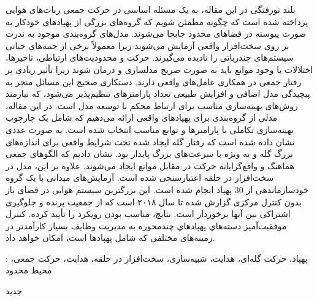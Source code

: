 


\pagestyle{empty}

\begin{وسط‌چین}
\end{وسط‌چین}


‌بلند
‌تورفتگی 
در این مقاله، به یک مسئله اساسی در حرکت جمعی ربات‌های هوایی پرداخته شده است که چگونه مطمئن شویم که گروه‌های بزرگی از پهپادهای خودکار به صورت پیوسته در فضاهای محدود جابجا می‌شوند. مدل‌های گروه‌بندی موجود به ندرت بر روی سخت‌افزار واقعی آزمایش می‌شوند زیرا معمولاً برخی از جنبه‌های حیاتی سیستم‌های چندرباتی را نادیده می‌گیرند. حرکت و محدودیت‌های ارتباطی، تاخیرها، اختلالات یا وجود موانع باید به صورت صریح مدلسازی و درمان شوند زیرا تأثیر زیادی بر رفتار جمعی در همکاری عامل‌های واقعی دارند. دستکاری صحیح این مسائل منجر به پیچیدگی مدل اضافی و افزایش طبیعی تعداد پارامترهای تنظیم‌پذیر می‌شود، که نیازمند روش‌های بهینه‌سازی مناسب برای ارتباط محکم با توسعه مدل است. در این مقاله، مدلی از گروه‌بندی برای پهپادهای واقعی ارائه می‌دهیم که شامل یک چارچوب بهینه‌سازی تکاملی با پارامترها و توابع مناسب انتخاب شده است. به صورت عددی نشان داده شده است که رفتار گله ایجاد شده تحت شرایط واقعی برای اندازه‌های بزرگ گله و به ویژه با سرعت‌های بزرگ پایدار بود. نشان دادیم که الگوهای جمعی هماهنگ و واقع‌گرایانه حرکت در مقابل موانع ایجاد می‌شوند. علاوه بر این، مدل  در سخت‌افزار در حلقه اعتبارسنجی شده است.  آزمایش‌های میدانی با یک گروه خودسازماندهی از 30 پهپاد انجام شده است. این بزرگترین سیستم هوایی در فضای باز بدون کنترل مرکزی گزارش شده تا سال ۲۰۱۸ است که از جمعیت پرنده و جلوگیری اشتراکی بین آنها برخوردار است. نتایج، مناسب بودن رویکرد را تأیید کرده. کنترل موفقیت‌آمیز دسته‌هاي پهپادهاي چندمحوره به مدیریت وظایف بسیار کارآمدتر در زمینه‌های مختلفی که شامل پهپادها است، امکان خواهد داد.

 : 
پهپاد، حرکت گله‌ای، هدایت، شبیه‌سازی، سخت‌افزار در حلقه، هدایت، حرکت جمعی، محیط محدود

‌جدید
